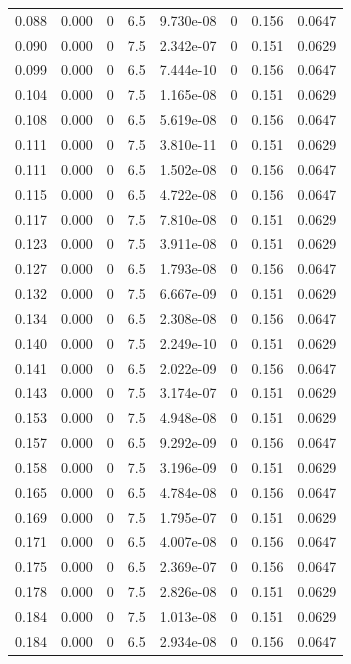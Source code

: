 \documentclass[preview]{standalone}
\begin{document}
{{\begin{tabular}{L{1.2cm}C{1.2cm} C{0.3cm}C{0.5cm} C{1.4cm}C{1.4cm} C{1.4cm}C{1.4cm}}
  0.088  &  0.000  & 0     & 6.5 &  9.730e-08  & 0  & 0.156 &  0.0647   \\ 
  0.090  &  0.000  & 0     & 7.5 &  2.342e-07  & 0  & 0.151 &  0.0629   \\ 
  0.099  &  0.000  & 0     & 6.5 &  7.444e-10  & 0  & 0.156 &  0.0647   \\ 
  0.104  &  0.000  & 0     & 7.5 &  1.165e-08  & 0  & 0.151 &  0.0629   \\ 
  0.108  &  0.000  & 0     & 6.5 &  5.619e-08  & 0  & 0.156 &  0.0647   \\ 
  0.111  &  0.000  & 0     & 7.5 &  3.810e-11  & 0  & 0.151 &  0.0629   \\ 
  0.111  &  0.000  & 0     & 6.5 &  1.502e-08  & 0  & 0.156 &  0.0647   \\ 
  0.115  &  0.000  & 0     & 6.5 &  4.722e-08  & 0  & 0.156 &  0.0647   \\ 
  0.117  &  0.000  & 0     & 7.5 &  7.810e-08  & 0  & 0.151 &  0.0629   \\ 
  0.123  &  0.000  & 0     & 7.5 &  3.911e-08  & 0  & 0.151 &  0.0629   \\ 
  0.127  &  0.000  & 0     & 6.5 &  1.793e-08  & 0  & 0.156 &  0.0647   \\ 
  0.132  &  0.000  & 0     & 7.5 &  6.667e-09  & 0  & 0.151 &  0.0629   \\ 
  0.134  &  0.000  & 0     & 6.5 &  2.308e-08  & 0  & 0.156 &  0.0647   \\ 
  0.140  &  0.000  & 0     & 7.5 &  2.249e-10  & 0  & 0.151 &  0.0629   \\ 
  0.141  &  0.000  & 0     & 6.5 &  2.022e-09  & 0  & 0.156 &  0.0647   \\ 
  0.143  &  0.000  & 0     & 7.5 &  3.174e-07  & 0  & 0.151 &  0.0629   \\ 
  0.153  &  0.000  & 0     & 7.5 &  4.948e-08  & 0  & 0.151 &  0.0629   \\ 
  0.157  &  0.000  & 0     & 6.5 &  9.292e-09  & 0  & 0.156 &  0.0647   \\ 
  0.158  &  0.000  & 0     & 7.5 &  3.196e-09  & 0  & 0.151 &  0.0629   \\ 
  0.165  &  0.000  & 0     & 6.5 &  4.784e-08  & 0  & 0.156 &  0.0647   \\ 
  0.169  &  0.000  & 0     & 7.5 &  1.795e-07  & 0  & 0.151 &  0.0629   \\ 
  0.171  &  0.000  & 0     & 6.5 &  4.007e-08  & 0  & 0.156 &  0.0647   \\ 
  0.175  &  0.000  & 0     & 6.5 &  2.369e-07  & 0  & 0.156 &  0.0647   \\ 
  0.178  &  0.000  & 0     & 7.5 &  2.826e-08  & 0  & 0.151 &  0.0629   \\ 
  0.184  &  0.000  & 0     & 7.5 &  1.013e-08  & 0  & 0.151 &  0.0629   \\ 
  0.184  &  0.000  & 0     & 6.5 &  2.934e-08  & 0  & 0.156 &  0.0647   \\ 
\hline 
\end{tabular} 

}}
\end{document}
